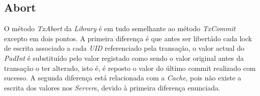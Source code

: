 \subsection{Abort}
\label{abort}

O método \textit{TxAbort} da \textit{Library} é em tudo semelhante ao método \textit{TxCommit} excepto em dois pontos. A primeira diferença é que antes ser libertádo cada lock de escrita associado a cada \textit{UID} referenciado pela transação, o valor actual do \textit{PadInt} é substituído pelo valor registado como sendo o valor original antes da transação o ter alterado, isto é, é reposto o valor do último commit realizado com sucesso. A segunda diferença está relacionada com a \textit{Cache}, pois não existe a escrita dos valores nos \textit{Server}s, devido à primeira diferença enunciada.
